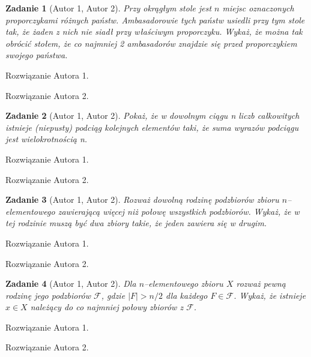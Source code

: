 \documentclass{mwart}
\newtheorem{zad}{Zadanie}[section]
\begin{document}
\begin{zad}[Autor 1, Autor 2]
    Przy okrągłym stole jest $n$ miejsc oznaczonych proporczykami różnych
    państw. Ambasadorowie tych państw usiedli przy tym stole tak, że żaden z nich nie siadł
    przy właściwym proporczyku. Wykaż, że można tak obrócić stołem, że co najmniej 2
    ambasadorów znajdzie się przed proporczykiem swojego państwa.
\end{zad}
\begin{mdframed}
    Rozwiązanie Autora 1.
\end{mdframed}
\begin{mdframed}
    Rozwiązanie Autora 2.
\end{mdframed}




\begin{zad}[Autor 1, Autor 2]
    Pokaż, że w dowolnym ciągu n liczb całkowitych istnieje (niepusty)
    podciąg kolejnych elementów taki, że suma wyrazów podciągu jest wielokrotnością n.
\end{zad}
\begin{mdframed}
    Rozwiązanie Autora 1.
\end{mdframed}
\begin{mdframed}
    Rozwiązanie Autora 2.
\end{mdframed}




\begin{zad}[Autor 1, Autor 2]
    Rozważ dowolną rodzinę podzbiorów zbioru $n$--elementowego zawierającą
    więcej niż połowę wszystkich podzbiorów. Wykaż, że w tej rodzinie muszą być dwa zbiory
    takie, że jeden zawiera się w drugim.
\end{zad}
\begin{mdframed}
    Rozwiązanie Autora 1.
\end{mdframed}
\begin{mdframed}
    Rozwiązanie Autora 2.
\end{mdframed}



\begin{zad}[Autor 1, Autor 2]
    Dla $n$--elementowego zbioru $X$ rozważ pewną rodzinę jego podzbiorów
    $\mathcal{F}$, gdzie $|F| > n/2$ dla każdego $F \in \mathcal{F}$. Wykaż, że istnieje
    $x \in X$ należący do co najmniej połowy zbiorów z $\mathcal{F}$.
\end{zad}
\begin{mdframed}
    Rozwiązanie Autora 1.
\end{mdframed}
\begin{mdframed}
    Rozwiązanie Autora 2.
\end{mdframed}
\end{document}
